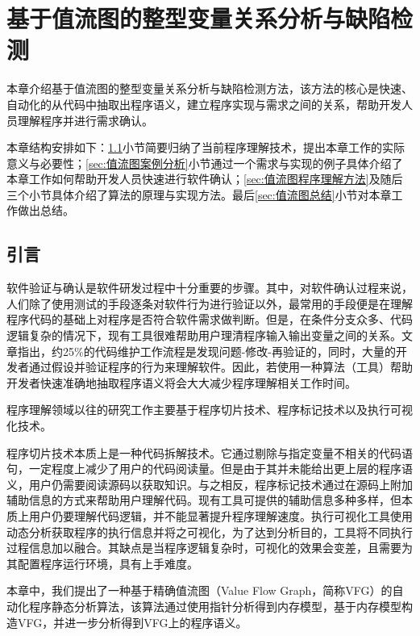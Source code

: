 
\chapter{基于值流图的整型变量关系分析与缺陷检测}
\label{sec:值流图}

本章介绍基于值流图的整型变量关系分析与缺陷检测方法，该方法的核心是快速、自动化的从代码中抽取出程序语义，建立程序实现与需求之间的关系，帮助开发人员理解程序并进行需求确认。

本章结构安排如下：\ref{sec:值流图引言}小节简要归纳了当前程序理解技术，提出本章工作的实际意义与必要性；\ref{sec:值流图案例分析}小节通过一个需求与实现的例子具体介绍了本章工作如何帮助开发人员快速进行软件确认；\ref{sec:值流图程序理解方法}及随后三个小节具体介绍了算法的原理与实现方法。最后\ref{sec:值流图总结}小节对本章工作做出总结。

\section{引言}
\label{sec:值流图引言}

软件验证与确认是软件研发过程中十分重要的步骤。其中，对软件确认过程来说，人们除了使用测试的手段逐条对软件行为进行验证以外，最常用的手段便是在理解程序代码的基础上对程序是否符合软件需求做判断。但是，在条件分支众多、代码逻辑复杂的情况下，现有工具很难帮助用户理清程序输入输出变量之间的关系。文章指出，约25\%的代码维护工作流程是发现问题-修改-再验证的，同时，大量的开发者通过假设并验证程序的行为来理解软件\cite{maalej2014comprehension}。因此，若使用一种算法（工具）帮助开发者快速准确地抽取程序语义将会大大减少程序理解相关工作时间。

程序理解\cite{boysen1979factors, sackman1968exploratory}领域以往的研究工作主要基于程序切片技术、程序标记技术以及执行可视化技术。

程序切片技术\cite{binkley1996program}本质上是一种代码拆解技术。它通过剔除与指定变量不相关的代码语句，一定程度上减少了用户的代码阅读量。但是由于其并未能给出更上层的程序语义，用户仍需要阅读源码以获取知识。与之相反，程序标记技术\cite{sulir2017labeling}通过在源码上附加辅助信息的方式来帮助用户理解代码。现有工具可提供的辅助信息多种多样，但本质上用户仍要理解代码逻辑，并不能显著提升程序理解速度。执行可视化工具使用动态分析获取程序的执行信息并将之可视化，为了达到分析目的，工具将不同执行过程信息加以融合。其缺点是当程序逻辑复杂时，可视化的效果会变差，且需要为其配置程序运行环境，具有上手难度。 

本章中，我们提出了一种基于精确值流图（Value Flow Graph，简称VFG）的自动化程序静态分析算法，该算法通过使用指针分析得到内存模型，基于内存模型构造VFG，并进一步分析得到VFG上的程序语义。

